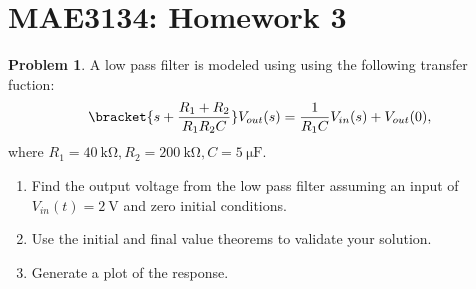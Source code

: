 \documentclass[10pt]{article}
\date{}
\theoremstyle{definition}
\newtheorem{prob}{Problem}[section]
\newenvironment{subprob}%
{\renewcommand{\theenumi}{\alph{enumi}}\renewcommand{\labelenumi}{(\theenumi)}\begin{enumerate}}%
{\end{enumerate}}%
\begin{document}
\pagestyle{empty}
\section*{MAE3134: Homework 3}
\vspace*{-0.4cm}

\begin{prob}
    A low pass filter is modeled using using the following transfer fuction:
    \begin{align}
        \bracket{s + \frac{R_1 + R_2}{R_1 R_2 C}} V_{out}(s) = \frac{1}{R_1 C} V_{in}(s) + V_{out}(0), 
    \end{align}
    where \( R_1 = \SI{40}{\kilo\ohm}, R_2 = \SI{200}{\kilo\ohm}, C = \SI{5}{\micro\farad}\).

    \begin{subprob}
        \item Find the output voltage from the low pass filter assuming an input of \( V_{in}(t) = \SI{2}{\volt}\) and zero initial conditions.
        \item Use the initial and final value theorems to validate your solution.
        \item Generate a plot of the response.
    \end{subprob}
\end{prob}
\end{document}
